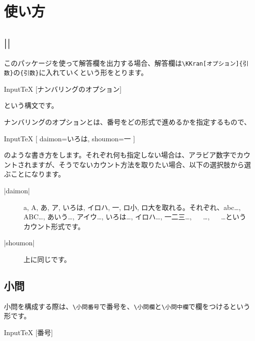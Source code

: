 \documentclass[luatex,fontsize=8pt,paper=b5,twoside]{jlreq}%
\begin{document}
\section{使い方}
\subsection{\KKverb|\KKran|}
このパッケージを使って解答欄を出力する場合、解答欄は\verb|\KKran[オプション]{引数}|の\verb|{引数}|に入れていくという形をとります。

\begin{SourceCode}{Input}{TeX}
  [ナンバリングのオプション]
\end{SourceCode}

\noindent という構文です。

ナンバリングのオプションとは、番号をどの形式で進めるかを指定するもので、

\begin{SourceCode}{Input}{TeX}
  [%
    daimon=いろは, shoumon=一
  ]
\end{SourceCode}

\noindent のような書き方をします。それぞれ何も指定しない場合は、アラビア数字でカウントされますが、そうでないカウント方法を取りたい場合、以下の選択肢から選ぶことになります。

\begin{description}
  \item[\KKverb|daimon|] a, A, あ, ア, いろは, イロハ, 一, ロ小, ロ大を取れる。それぞれ、abc\dots, ABC\dots, あいう\dots, アイウ\dots, いろは\dots, イロハ\dots, 一二三\dots,  \  \ \dots,  \  \ \dots というカウント形式です。
  \item[\KKverb|shoumon|] 上に同じです。
\end{description}

\subsection{小問}
小問を構成する際は、\verb|\小問番号|で番号を、\verb|\小問欄|と\verb|\小問中欄|で欄をつけるという形です。

\begin{SourceCode}{Input}{TeX}
  [番号]

\end{SourceCode}
\end{document}
